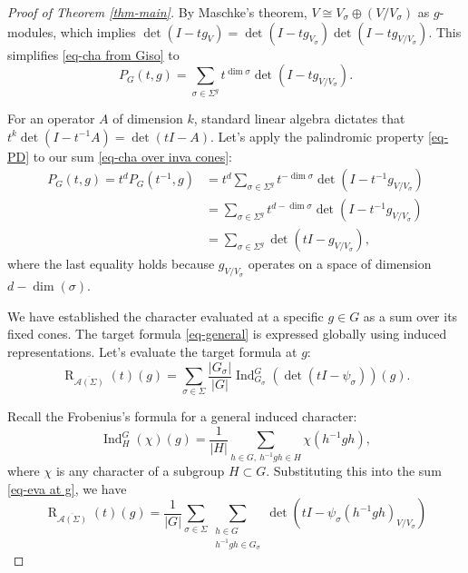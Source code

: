 \documentclass{amsart}
\theoremstyle{definition}
\theoremstyle{remark}
\numberwithin{equation}{section}
\begin{document}
\begin{proof}[Proof of Theorem \ref{thm-main}]
By Maschke's theorem, $V \cong V_\sigma \oplus (V/V_\sigma)$ as $g$-modules, which implies $\operatorname{det}(I - t g_V) = \operatorname{det}(I - t g_{V_\sigma}) \operatorname{det}(I - t g_{V/V_\sigma})$. This simplifies \eqref{eq-cha from Giso} to
\begin{equation} \label{eq-cha over inva cones}
P_G(t, g) = \sum_{\sigma \in \Sigma^g} t^{\dim \sigma} \operatorname{det}(I - t g_{V/V_\sigma}).
\end{equation} 

For an operator $A$ of dimension $k$, standard linear algebra dictates that $t^k \operatorname{det}(I - t^{-1}A) = \operatorname{det}(tI - A)$. Let's apply the palindromic property \eqref{eq-PD} to our sum \eqref{eq-cha over inva cones}:
\begin{equation} \label{eq-reverse}
    \begin{aligned}
P_G(t, g)=t^d P_G(t^{-1}, g) &= t^d \sum_{\sigma \in \Sigma^g} t^{-\dim \sigma} \operatorname{det}(I - t^{-1} g_{V/V_\sigma}) \\
&= \sum_{\sigma \in \Sigma^g} t^{d - \dim \sigma} \operatorname{det}(I - t^{-1} g_{V/V_\sigma}) \\
&= \sum_{\sigma \in \Sigma^g} \operatorname{det}(t I - g_{V/V_\sigma}),
\end{aligned} 
\end{equation}
where the last equality holds because $g_{V/V_\sigma}$ operates on a space of dimension $d - \dim(\sigma)$. 

We have established the character evaluated at a specific $g \in G$ as a sum over its fixed cones. The target formula \eqref{eq-general} is expressed globally using induced representations. Let's evaluate the target formula at $g$:
\begin{equation} \label{eq-eva at g}
\operatorname{R}_{\overline{\mathcal{A}(\Sigma)}}(t)(g) = \sum_{\sigma \in \Sigma} \frac{|G_\sigma|}{|G|} \operatorname{Ind}_{G_\sigma}^G \left(\operatorname{det}(tI-\psi_\sigma)\right)(g).    
\end{equation}  

Recall the Frobenius's formula for a general induced character: $$\operatorname{Ind}_{H}^G(\chi)(g) = \frac{1}{|H|} \sum_{h \in G, \ h^{-1}gh \in H} \chi(h^{-1}gh),$$
where $\chi$ is any character of a subgroup $H\subset G$.
Substituting this into the sum \eqref{eq-eva at g}, we have
\begin{equation} \label{eq-double}
\operatorname{R}_{\overline{\mathcal{A}(\Sigma)}}(t)(g) = \frac{1}{|G|} \sum_{\sigma \in \Sigma} \sum_{\substack{h \in G \\ h^{-1}gh \in G_\sigma}} \operatorname{det}(tI - \psi_\sigma(h^{-1}gh)_{V/V_\sigma})   
\end{equation}


\end{proof}
\end{document}
